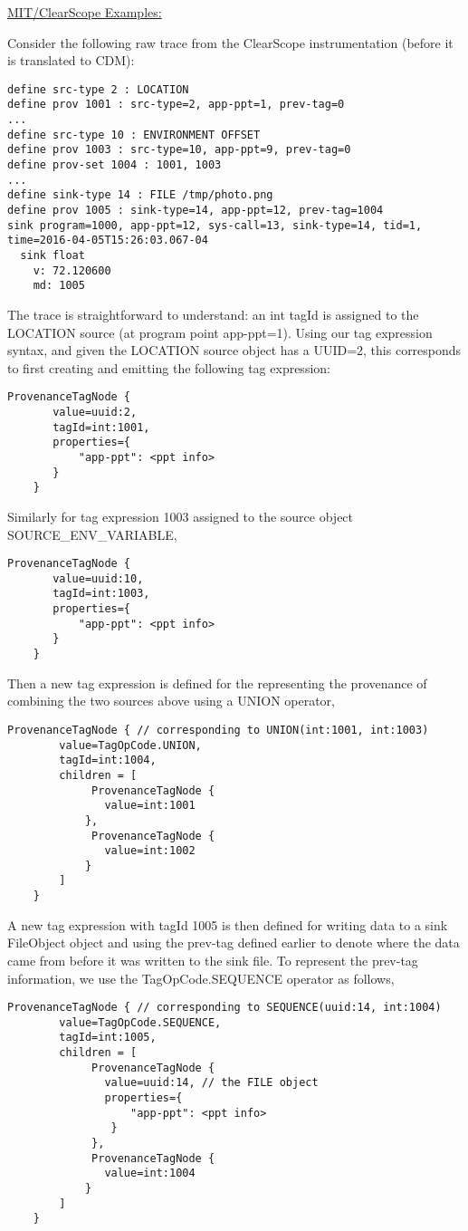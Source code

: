 \noindent \underline{MIT/ClearScope Examples:}

Consider the following raw trace from the ClearScope instrumentation (before it is translated to CDM):
\begin{Verbatim}[fontsize=\small]
define src-type 2 : LOCATION
define prov 1001 : src-type=2, app-ppt=1, prev-tag=0
...
define src-type 10 : ENVIRONMENT OFFSET
define prov 1003 : src-type=10, app-ppt=9, prev-tag=0
define prov-set 1004 : 1001, 1003
...
define sink-type 14 : FILE /tmp/photo.png
define prov 1005 : sink-type=14, app-ppt=12, prev-tag=1004
sink program=1000, app-ppt=12, sys-call=13, sink-type=14, tid=1, time=2016-04-05T15:26:03.067-04
  sink float 
    v: 72.120600
    md: 1005
\end{Verbatim}
The trace is straightforward to understand: an int tagId {} is assigned to the {\sf LOCATION} source (at program point app-ppt=1). Using our tag expression syntax, and given the {\sf LOCATION} source object has a UUID=2, this corresponds to first creating and emitting the following tag expression:
\begin{Verbatim}[fontsize=\small]
    ProvenanceTagNode {
       value=uuid:2,
       tagId=int:1001,
       properties={
           "app-ppt": <ppt info>
       }
    }    
\end{Verbatim}
Similarly for tag expression 1003 assigned to the source object SOURCE\_ENV\_VARIABLE,
\begin{Verbatim}[fontsize=\small]
    ProvenanceTagNode {
       value=uuid:10,
       tagId=int:1003,
       properties={
           "app-ppt": <ppt info>
       }
    }    
\end{Verbatim}
Then a new tag expression is defined for the representing the provenance of combining the two sources above using a UNION operator,
\begin{Verbatim}[fontsize=\small]
    ProvenanceTagNode { // corresponding to UNION(int:1001, int:1003)
        value=TagOpCode.UNION,
        tagId=int:1004,
        children = [
             ProvenanceTagNode {
               value=int:1001
            },
             ProvenanceTagNode {
               value=int:1002
            }
        ]
    }
\end{Verbatim}
A new tag expression with tagId 1005 is then defined for writing data to a sink FileObject object and using the prev-tag defined earlier to denote where the data came from before it was written to the sink file. To represent the prev-tag information, we use the TagOpCode.SEQUENCE operator as follows,
\begin{Verbatim}[fontsize=\small]
    ProvenanceTagNode { // corresponding to SEQUENCE(uuid:14, int:1004)
        value=TagOpCode.SEQUENCE,
        tagId=int:1005,
        children = [
             ProvenanceTagNode {
               value=uuid:14, // the FILE object 
               properties={
                   "app-ppt": <ppt info>
                }
             },
             ProvenanceTagNode {
               value=int:1004
            }
        ]
    }
\end{Verbatim}
